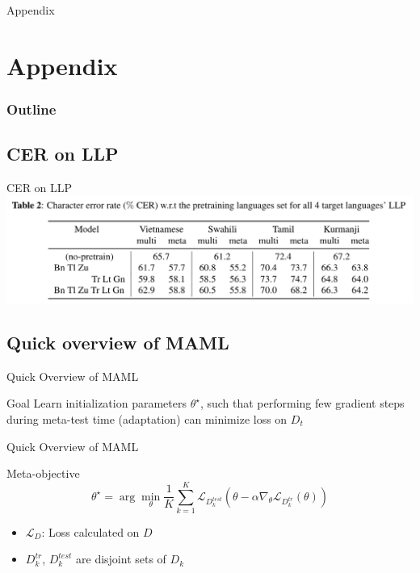 \documentclass{beamer}
\begin{document}
\begin{frame}
	\begin{center}
    \LARGE{Appendix}
	\end{center}
\end{frame}

\section{Appendix}
\begin{frame}
\frametitle{Outline}
\tableofcontents
\end{frame}

\subsection{CER on LLP}
\begin{frame}[t]{CER on LLP}
  \center \includegraphics[width=1.0\textwidth]{fig/llp_table.png}
\end{frame}

\subsection{Quick overview of MAML}
\begin{frame}[t]{Quick Overview of MAML}
  \label{overview of maml}
  \begin{block}{Goal}
    Learn initialization parameters $\theta^\star$, such that performing few gradient steps during meta-test time (adaptation) can minimize loss on $D_t$
  \end{block}
\end{frame}

\begin{frame}[t]{Quick Overview of MAML}
  \begin{block}{Meta-objective}
    \begin{equation*}
    \theta^\star = \arg \min_\theta \frac{1}{K}\sum_{k=1}^{K}\mathcal{L}_{D_k^{test}}(\theta - \alpha \nabla_\theta \mathcal{L}_{D_k^{tr}}(\theta))
    \end{equation*}
  \end{block}

  \begin{itemize}
    \item $\mathcal{L}_D$: Loss calculated on $D$
    \item $D_k^{tr}$, $D_k^{test}$ are disjoint sets of $D_k$
  \end{itemize}
\end{frame}
\end{document}
